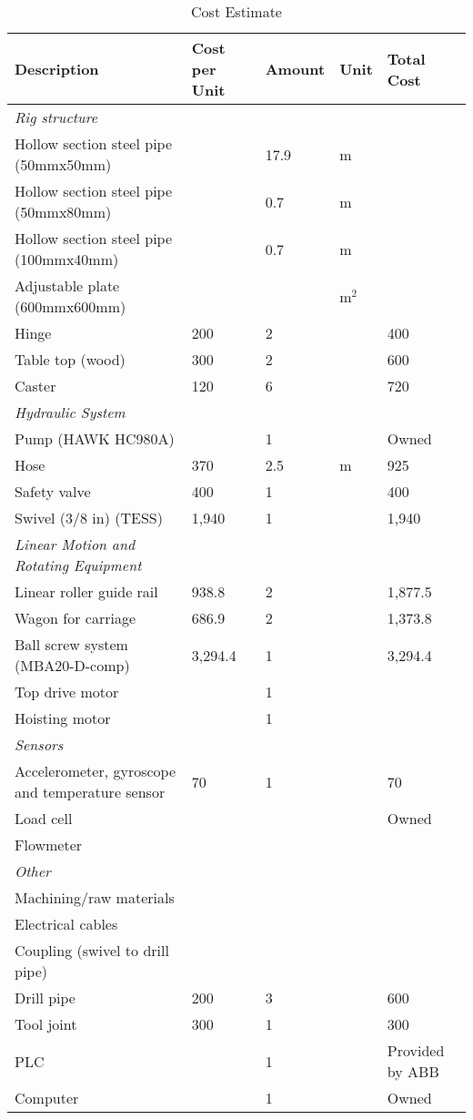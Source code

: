 \begin{table} [H]
    \centering
    \caption{Cost Estimate}
    \begin{tabular}{p{} p{3cm} p{} p{2cm} p{}}
        \large{Description} & \large{Cost per Unit} & \large{Amount} & \large{Unit} & \large {Total Cost} \\ \hline \hline
        \textit {\large{Rig structure}} \\
        Hollow section steel pipe (50mmx50mm) & &17.9 & m \\
        Hollow section steel pipe (50mmx80mm) & & 0.7 & m \\
        Hollow section steel pipe (100mmx40mm) & & 0.7 & m \\
        Adjustable plate (600mmx600mm) & & & m$^2$ \\
        Hinge & 200 & 2 & & 400 \\
        Table top (wood) & 300 & 2 & & 600 \\
        Caster & 120 & 6 & & 720 \\ \hline
         \textit {\large{Hydraulic System}} \\
        Pump (HAWK HC980A) & & 1 & & Owned \\
        Hose & 370 & 2.5 & m & 925 \\
        Safety valve & 400 & 1 & & 400 \\
        Swivel (3/8 in) (TESS) & 1,940 & 1 & & 1,940 \\ \hline
        \textit {\large{Linear Motion and Rotating Equipment}} \\
        Linear roller guide rail & 938.8 & 2 & & 1,877.5 \\
        Wagon for carriage & 686.9 & 2 & & 1,373.8 \\
        Ball screw system (MBA20-D-comp) & 3,294.4 & 1 & & 3,294.4 \\
        Top drive motor & & 1 & & \\
        Hoisting motor & & 1 & & \\ \hline
        \textit {\large{Sensors}} \\
        Accelerometer, gyroscope and temperature sensor & 70 & 1 & & 70 \\
        Load cell & & & & Owned \\
        Flowmeter \\ \hline
        \textit {\large{Other}} \\
        Machining/raw materials \\
        Electrical cables \\
        Coupling (swivel to drill pipe) \\
        Drill pipe & 200 & 3 & & 600 \\
        Tool joint & 300 & 1 & & 300 \\
        PLC & & 1 & & Provided by ABB \\
        Computer & & 1 & & Owned \\ \hline
        
         
        
    \end{tabular}
    \label{tab:sumpressure}
\end{table}
